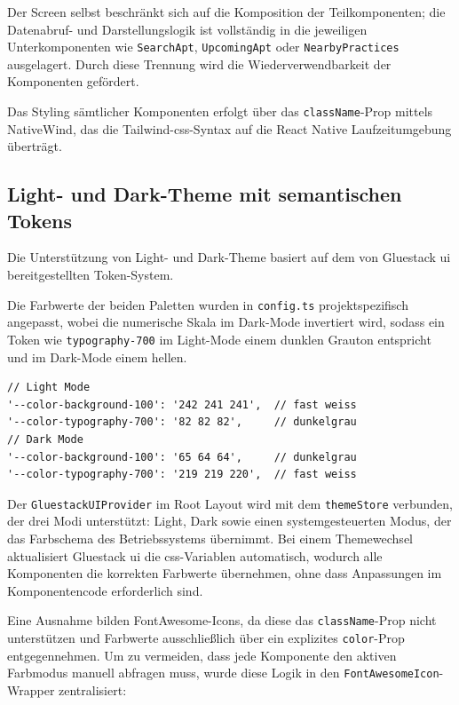 Der Screen selbst beschränkt sich auf die Komposition der Teilkomponenten; die Datenabruf- und Darstellungslogik ist vollständig in die jeweiligen Unterkomponenten wie \texttt{SearchApt}, \texttt{UpcomingApt} oder \texttt{NearbyPractices} ausgelagert. Durch diese Trennung wird die Wiederverwendbarkeit der Komponenten gefördert.

Das Styling sämtlicher Komponenten erfolgt über das \texttt{className}-Prop mittels NativeWind, das die Tailwind-\gls{css}-Syntax auf die React Native Laufzeitumgebung überträgt.

\subsection{Light- und Dark-Theme mit semantischen Tokens}

Die Unterstützung von Light- und Dark-Theme basiert auf dem von Gluestack \gls{ui} bereitgestellten Token-System. 

Die Farbwerte der beiden Paletten wurden in \texttt{config.ts} projektspezifisch angepasst, wobei die numerische Skala im Dark-Mode invertiert wird, sodass ein Token wie \texttt{typography-700} im Light-Mode einem dunklen Grauton entspricht und im Dark-Mode einem hellen.

\begin{listing}[H]
\begin{verbatim}
// Light Mode
'--color-background-100': '242 241 241',  // fast weiss
'--color-typography-700': '82 82 82',     // dunkelgrau
// Dark Mode
'--color-background-100': '65 64 64',     // dunkelgrau
'--color-typography-700': '219 219 220',  // fast weiss
\end{verbatim}
\caption{Farbtoken für Light- und Dark-Mode in config.ts}
\label{lst:color-tokens}
\end{listing}

Der \texttt{GluestackUIProvider} im Root Layout wird mit dem \texttt{themeStore} verbunden, der drei Modi unterstützt: Light, Dark sowie einen systemgesteuerten Modus, der das Farbschema des Betriebssystems übernimmt. Bei einem Themewechsel aktualisiert Gluestack \gls{ui} die \gls{css}-Variablen automatisch, wodurch alle Komponenten die korrekten Farbwerte übernehmen, ohne dass Anpassungen im Komponentencode erforderlich sind.

Eine Ausnahme bilden FontAwesome-Icons, da diese das \texttt{className}-Prop nicht
unterstützen und Farbwerte ausschließlich über ein explizites \texttt{color}-Prop
entgegennehmen. Um zu vermeiden, dass jede Komponente den aktiven Farbmodus manuell
abfragen muss, wurde diese Logik in den \texttt{FontAwesomeIcon}-Wrapper zentralisiert:

